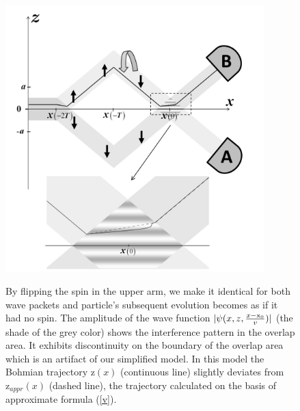 \documentclass[12pt,preprint,tightenlines]{elsarticle}
\begin{document}
\begin{figure}[H]\vspace{-10pt}
  \includegraphics[width=10cm]{8.pdf}\\\vspace{-5pt}
    \caption{ By flipping the spin in the upper arm, we make it identical for both wave packets and particle's subsequent evolution becomes as if it had no spin. The amplitude of the wave function $|\psi(x,z,\frac{x-{\rm x}_0}{v})|$ (the shade of the grey color) shows  the interference pattern in the overlap area. It exhibits discontinuity on the boundary of the overlap area which is an artifact of our simplified model. In this model the Bohmian trajectory  $\mathrm{z}(x)$ (continuous line) slightly deviates from  $\mathrm{z}_{appr}(x)$ (dashed line), the trajectory calculated on the basis of approximate formula (\ref{v}). }
\end{figure}
\end{document}
